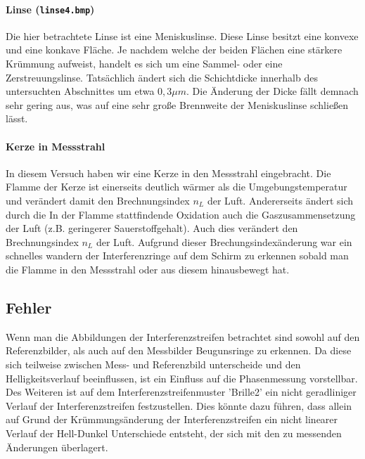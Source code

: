 \paragraph{Linse (\texttt{linse4.bmp})}
Die hier betrachtete Linse ist eine Meniskuslinse. Diese Linse besitzt eine konvexe und eine konkave Fläche. Je nachdem welche der beiden Flächen eine stärkere Krümmung aufweist, handelt es sich um eine Sammel- oder eine Zerstreuungslinse. 
Tatsächlich ändert sich die Schichtdicke innerhalb des untersuchten Abschnittes um etwa $0,3\mu m$. Die Änderung der Dicke fällt demnach sehr gering aus, was auf eine sehr große Brennweite der Meniskuslinse schließen lässt. 

\paragraph{Kerze in Messstrahl}
In diesem Versuch haben wir eine Kerze in den Messstrahl eingebracht. Die Flamme der Kerze ist einerseits deutlich wärmer als die Umgebungstemperatur und verändert damit den Brechnungsindex $n_L$ der Luft. Andererseits ändert sich durch die In der Flamme stattfindende Oxidation auch die Gaszusammensetzung der Luft (z.B. geringerer Sauerstoffgehalt). Auch dies verändert den Brechnungsindex $n_L$ der Luft. 
Aufgrund dieser Brechungsindexänderung war ein schnelles wandern der Interferenzringe auf dem Schirm zu erkennen sobald man die Flamme in den Messstrahl oder aus diesem hinausbewegt hat.

\subsection{Fehler}
Wenn man die Abbildungen der Interferenzstreifen betrachtet sind sowohl auf den Referenzbilder, als auch auf den Messbilder Beugunsringe zu erkennen. Da diese sich teilweise zwischen Mess- und Referenzbild unterscheide und den Helligkeitsverlauf beeinflussen, ist ein Einfluss auf die Phasenmessung vorstellbar.
Des Weiteren ist auf dem Interferenzstreifenmuster 'Brille2' ein nicht geradliniger Verlauf der Interferenzstreifen festzustellen. Dies könnte dazu führen, dass allein auf Grund der Krümmungsänderung der Interferenzstreifen ein nicht linearer Verlauf der Hell-Dunkel Unterschiede entsteht, der sich mit den zu messenden Änderungen überlagert.


